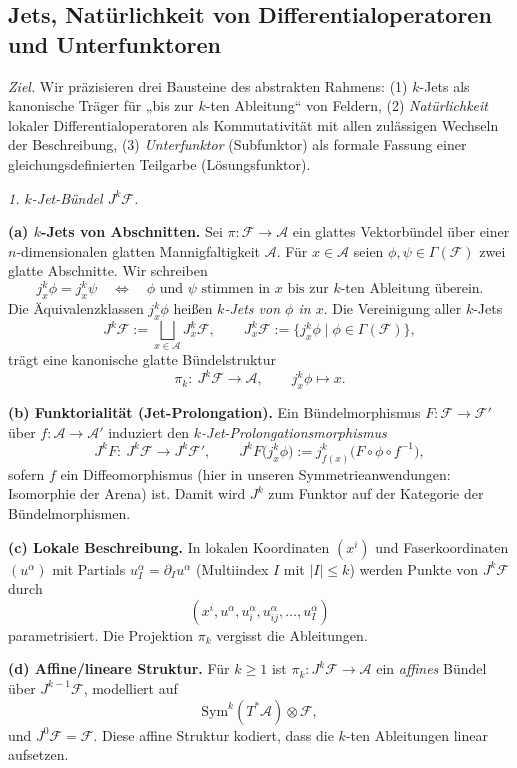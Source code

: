 \documentclass[10pt, letterpaper]{article}
\begin{document}
\pagebreak

\subsection{Jets, Natürlichkeit von Differentialoperatoren und Unterfunktoren}

\emph{Ziel.}
Wir präzisieren drei Bausteine des abstrakten Rahmens:
(1) $k$-Jets als kanonische Träger für „bis zur $k$-ten Ableitung“
von Feldern, (2) \emph{Natürlichkeit} lokaler Differentialoperatoren
als Kommutativität mit allen zulässigen Wechseln der Beschreibung,
(3) \emph{Unterfunktor} (Subfunktor) als formale Fassung einer
gleichungsdefinierten Teilgarbe (Lösungsfunktor).

\bigskip
\emph{1. $k$-Jet-Bündel $J^k\mathcal F$.}

\textbf{(a) $k$-Jets von Abschnitten.}
Sei $\pi:\mathcal F\to \mathcal A$ ein glattes Vektorbündel über
einer $n$-dimensionalen glatten Mannigfaltigkeit $\mathcal A$.
Für $x\in\mathcal A$ seien $\phi,\psi\in\Gamma(\mathcal F)$ zwei glatte Abschnitte.
Wir schreiben
\[
j_x^k\phi = j_x^k\psi \quad \Longleftrightarrow \quad
\text{$\phi$ und $\psi$ stimmen in $x$ bis zur $k$-ten Ableitung überein.}
\]
Die Äquivalenzklassen $j_x^k\phi$ heißen \emph{$k$-Jets von $\phi$ in $x$}.
Die Vereinigung aller $k$-Jets
\[
J^k\mathcal F := \bigsqcup_{x\in\mathcal A} J_x^k\mathcal F,
\qquad J_x^k\mathcal F:=\{j_x^k\phi\mid \phi\in\Gamma(\mathcal F)\},
\]
trägt eine kanonische glatte Bündelstruktur
\[
\pi_k:\ J^k\mathcal F \longrightarrow \mathcal A,\qquad j_x^k\phi \mapsto x.
\]

\textbf{(b) Funktorialität (Jet-Prolongation).}
Ein Bündelmorphismus $F:\mathcal F\to\mathcal F'$ über $f:\mathcal A\to\mathcal A'$
induziert den \emph{$k$-Jet-Prolongationsmorphismus}
\[
J^kF:\ J^k\mathcal F \longrightarrow J^k\mathcal F',
\qquad
J^kF\big(j_x^k\phi\big) := j_{f(x)}^k\big(F\circ \phi \circ f^{-1}\big),
\]
sofern $f$ ein Diffeomorphismus (hier in unseren Symmetrieanwendungen: Isomorphie der Arena) ist.
Damit wird $J^k$ zum Funktor auf der Kategorie der Bündelmorphismen.

\textbf{(c) Lokale Beschreibung.}
In lokalen Koordinaten $(x^i)$ und Faserkoordinaten $(u^\alpha)$ mit Partials
$u^\alpha_I = \partial_I u^\alpha$ (Multiindex $I$ mit $|I|\le k$)
werden Punkte von $J^k\mathcal F$ durch
\[
(x^i, u^\alpha, u^\alpha_{i}, u^\alpha_{i j}, \dots, u^\alpha_{I})
\]
parametrisiert. Die Projektion $\pi_k$ vergisst die Ableitungen.

\textbf{(d) Affine/lineare Struktur.}
Für $k\ge 1$ ist $\pi_k:J^k\mathcal F\to \mathcal A$ ein \emph{affines} Bündel
über $J^{k-1}\mathcal F$, modelliert auf
\[
\mathrm{Sym}^k(T^\ast\mathcal A)\otimes \mathcal F,
\]
und $J^0\mathcal F=\mathcal F$. Diese affine Struktur kodiert,
dass die $k$-ten Ableitungen linear aufsetzen.
\end{document}

